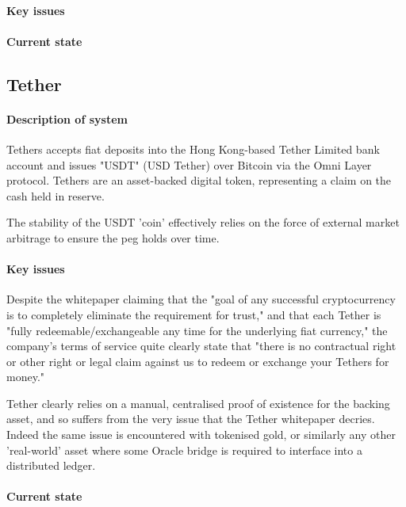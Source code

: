 \paragraph{Key issues}

\paragraph{Current state}


\subsection{Tether}

\paragraph{Description of system}

Tethers accepts fiat deposits into the Hong Kong-based Tether Limited bank account and issues "USDT" (USD Tether) over Bitcoin via the Omni Layer protocol. Tethers are an asset-backed digital token, representing a claim on the cash held in reserve.

The stability of the USDT 'coin' effectively relies on the force of external market arbitrage to ensure the peg holds over time.

\paragraph{Key issues}

Despite the whitepaper claiming that the "goal of any successful cryptocurrency is to completely eliminate the requirement for trust," and that each Tether is "fully redeemable/exchangeable any time for the underlying fiat currency," the company's terms of service quite clearly state that "there is no contractual right or other right or legal claim against us to redeem or exchange your Tethers for money."

Tether clearly relies on a manual, centralised proof of existence for the backing asset, and so suffers from the very issue that the Tether whitepaper decries. Indeed the same issue is encountered with tokenised gold, or similarly any other 'real-world' asset where some Oracle bridge is required to interface into a distributed ledger.

\paragraph{Current state}

